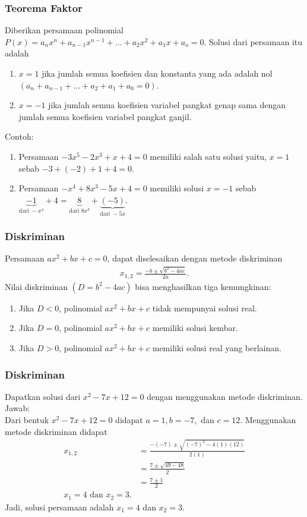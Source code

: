 \documentclass[11pt]{beamer}
\begin{document}
	\begin{frame}
		\frametitle{Teorema Faktor}
		Diberikan persamaan polinomial $P(x)=a_nx^n+a_{n-1}x^{n-1}+...+a_2x^2+a_1x+a_o=0$. Solusi dari persamaan itu adalah
		\begin{enumerate}
			\item $x=1$ jika jumlah semua koefisien dan konstanta yang ada adalah nol $(a_n+a_{n-1}+...+a_2+a_1+a_0=0)$.
			\item $x=-1$ jika jumlah semua koefisien variabel pangkat genap sama dengan jumlah semua koefisien variabel pangkat ganjil.
		\end{enumerate}
		Contoh:\\
		\begin{enumerate}
			\item Persamaan $-3x^5-2x^3+x+4=0$ memiliki salah satu solusi yaitu, $x=1$ sebab $-3+(-2)+1+4=0$.
			\item Persamaan $-x^4+8x^3-5x+4=0$ memiliki solusi $x=-1$ sebab $\underbrace{-1}_{\text{dari }-x^4}+4=\underbrace{8}_{\text{dari }8x^3}+\underbrace{(-5)}_{\text{dari }-5x}$.
		\end{enumerate}
		 		
	\end{frame}
		
	\begin{frame}
		\frametitle{Diskriminan}
		Persamaan $ax^2+bx+c=0$, dapat diselesaikan dengan metode diskriminan
		\begin{align*}
			x_{1,2}=\frac{-b\pm\sqrt{b^2-4ac}}{2a}.
		\end{align*}
		Nilai diskriminan $(D=b^2-4ac)$ bisa menghasilkan tiga kemungkinan:
		\begin{enumerate}
			\item Jika $D<0$, polinomial $ax^2+bx+c$ tidak mempunyai solusi real.
			\item Jika $D=0$, polinomial $ax^2+bx+c$ memiliki solusi kembar.
			\item Jika $D>0$, polinomial $ax^2+bx+c$ memiliki solusi real yang berlainan.
		\end{enumerate}
		
	\end{frame}
	
	\begin{frame}
		\frametitle{Diskriminan}
		Dapatkan solusi dari $x^2-7x+12=0$ dengan menggunakan metode diskriminan.\\Jawab:\\
		Dari bentuk $x^2-7x+12=0$ didapat $a=1, b=-7,$ dan $c=12$. Menggunakan metode diskriminan didapat
		\begin{align*}
			x_{1,2}&=\frac{-(-7)\pm\sqrt{(-7)^2-4(1)(12)}}{2(1)}\\
			&=\frac{7\pm\sqrt{49-48}}{2}\\
			&=\frac{7\pm1}{2}\\
			x_1 = 4 \text{ dan } x_2=3.
		\end{align*}
		Jadi, solusi persamaan adalah $x_1=4$ dan $x_2=3$.
		
	\end{frame}
	
\end{document}
